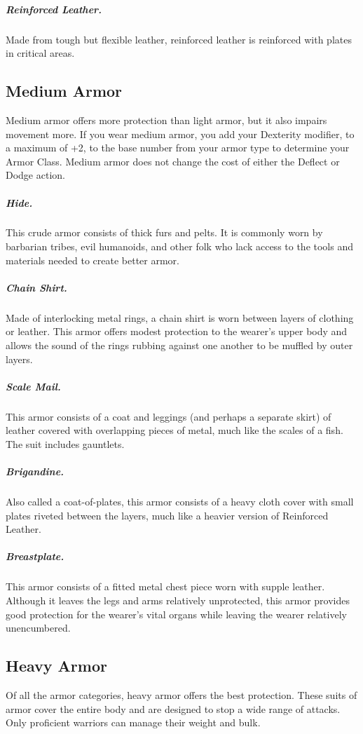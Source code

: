 \subparagraph*{Reinforced Leather.} Made from tough but flexible leather, reinforced leather is reinforced with plates in critical areas.

\subsection{Medium Armor}

Medium armor offers more protection than light armor, but it also impairs movement more. If you wear medium armor, you add your Dexterity modifier, to a maximum of +2, to the base number from your armor type to determine your Armor Class. Medium armor does not change the cost of either the Deflect or Dodge action.

\subparagraph*{Hide.} This crude armor consists of thick furs and pelts. It is commonly worn by barbarian tribes, evil humanoids, and other folk who lack access to the tools and materials needed to create better armor.

\subparagraph*{Chain Shirt.} Made of interlocking metal rings, a chain shirt is worn between layers of clothing or leather. This armor offers modest protection to the wearer's upper body and allows the sound of the rings rubbing against one another to be muffled by outer layers.

\subparagraph*{Scale Mail.} This armor consists of a coat and leggings (and perhaps a separate skirt) of leather covered with overlapping pieces of metal, much like the scales of a fish. The suit includes gauntlets.

\subparagraph*{Brigandine.} Also called a coat-of-plates, this armor consists of a heavy cloth cover with small plates riveted between the layers, much like a heavier version of Reinforced Leather.

\subparagraph*{Breastplate.} This armor consists of a fitted metal chest piece worn with supple leather. Although it leaves the legs and arms relatively unprotected, this armor provides good protection for the wearer's vital organs while leaving the wearer relatively unencumbered.

\subsection{Heavy Armor}

Of all the armor categories, heavy armor offers the best protection. These suits of armor cover the entire body and are designed to stop a wide range of attacks. Only proficient warriors can manage their weight and bulk.

